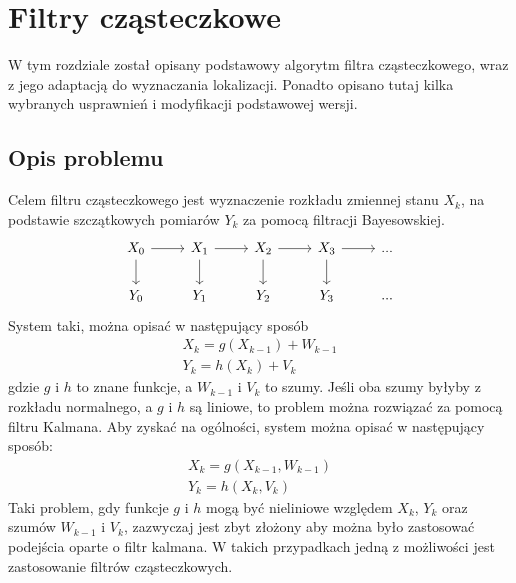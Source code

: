 \chapter{Filtry cząsteczkowe}
W tym rozdziale został opisany podstawowy algorytm filtra cząsteczkowego, wraz z jego adaptacją do wyznaczania lokalizacji. Ponadto opisano tutaj kilka wybranych usprawnień i modyfikacji podstawowej wersji.
\section{Opis problemu}
Celem filtru cząsteczkowego jest wyznaczenie rozkładu zmiennej stanu $X_k$, na podstawie szczątkowych pomiarów $Y_k$ za pomocą filtracji Bayesowskiej. \\
\begin{equation*}
\begin{tikzcd}
	X_0 \arrow{r} \arrow{d} &X_1 \arrow{r} \arrow{d} &X_2 \arrow{r} \arrow{d} &X_3\arrow{r} \arrow{d} &...\\
	Y_0 &Y_1 &Y_2 &Y_3 &...
\end{tikzcd} 
\end{equation*}
System taki, można opisać w następujący sposób
\begin{equation*}
	\begin{aligned}
		X_k=g(X_{k-1})+W_{k-1} \\
		Y_k=h(X_k)+V_k
	\end{aligned}
\end{equation*}
gdzie $g$ i $h$ to znane funkcje, a $W_{k-1}$ i $V_k$ to szumy. Jeśli oba szumy byłyby z rozkładu normalnego, a $g$ i $h$ są liniowe, to problem można rozwiązać za pomocą filtru Kalmana. Aby zyskać na ogólności, system można opisać w następujący sposób:
\begin{equation}\label{problem_eq}
	\begin{aligned}
		X_k=g(X_{k-1}, W_{k-1}) \\
		Y_k=h(X_k, V_k)
	\end{aligned}
\end{equation}
Taki problem, gdy funkcje $g$ i $h$ mogą być nieliniowe względem $X_k$, $Y_k$ oraz szumów $W_{k-1}$ i $V_k$, zazwyczaj jest zbyt złożony aby można było zastosować podejścia oparte o filtr kalmana. W takich przypadkach jedną z możliwości jest zastosowanie filtrów cząsteczkowych.
